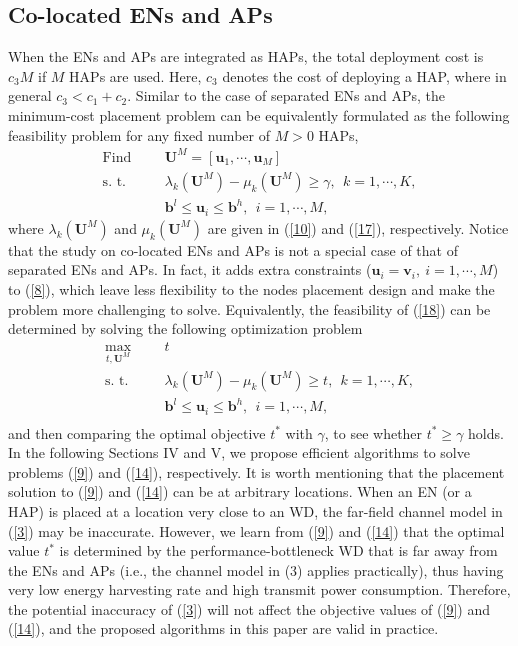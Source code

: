 \documentclass[journal, draftcls, one column, 12pt]{IEEEtran}
\begin{document}
\subsection{Co-located ENs and APs}
When the ENs and APs are integrated as HAPs, the total deployment cost is $c_3 M$ if $M$ HAPs are used. Here, $c_3$ denotes the cost of deploying a HAP, where in general $c_3<c_1+c_2$. Similar to the case of separated ENs and APs, the minimum-cost placement problem can be equivalently formulated as the following feasibility problem for any fixed number of $M>0$ HAPs,
\begin{equation}
\label{18}
   \begin{aligned}
    \text{Find}&  & &  \mathbf{U}^M = \left[\mathbf{u}_1,\cdots,\mathbf{u}_M\right]\\
    \text{s. t.}&     & &  \lambda_k \left(\mathbf{U}^M\right) -\mu_k\left(\mathbf{U}^M\right)\geq \gamma, \ \ k=1,\cdots,K,\\
    & & & \mathbf{b}^l\leq \mathbf{u}_i\leq \mathbf{b}^h,\ \ i=1,\cdots,M,
   \end{aligned}
\end{equation}
where $\lambda_k \left(\mathbf{U}^M\right)$ and $\mu_k\left(\mathbf{U}^M\right)$ are given in (\ref{10}) and (\ref{17}), respectively. Notice that the study on co-located ENs and APs is not a special case of that of separated ENs and APs. In fact, it adds extra constraints ($\mathbf{u}_i=\mathbf{v}_i,\ i=1,\cdots,M$) to (\ref{8}), which leave less flexibility to the nodes placement design and make the problem more challenging to solve. Equivalently, the feasibility of (\ref{18}) can be determined by solving the following optimization problem
\begin{equation}
\label{14}
   \begin{aligned}
    \underset{t,\mathbf{U}^M}{\text{max}}&  & & t \\
    \text{s. t.}&   &  & \lambda_k \left(\mathbf{U}^M\right) -\mu_k\left(\mathbf{U}^M\right) \geq t,\ \ k=1,\cdots,K, \\
    & & & \mathbf{b}^l\leq \mathbf{u}_i\leq \mathbf{b}^h,\ \ i=1,\cdots,M, \\
   \end{aligned}
\end{equation}
and then comparing the optimal objective $t^*$ with $\gamma$, to see whether $t^*\geq \gamma$ holds. In the following Sections IV and V, we propose efficient algorithms to solve problems (\ref{9}) and (\ref{14}), respectively. It is worth mentioning that the placement solution to (\ref{9}) and (\ref{14}) can be at arbitrary locations. When an EN (or a HAP) is placed at a location very close to an WD, the far-field channel model in (\ref{3}) may be inaccurate. However, we learn from (\ref{9}) and (\ref{14}) that the optimal value $t^*$ is determined by the performance-bottleneck WD that is far away from the ENs and APs (i.e., the channel model in (3) applies practically), thus having very low energy harvesting rate and high transmit power consumption. Therefore, the potential inaccuracy of (\ref{3}) will not affect the objective values of (\ref{9}) and (\ref{14}), and the proposed algorithms in this paper are valid in practice.
\end{document}
